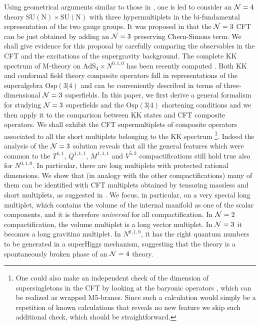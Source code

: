 \documentclass[a4paper,12pt]{article}
\def\n010{N^{0,1,0}}
\begin{document}
Using geometrical arguments similar to those in \cite{witkleb,3dcft},
one is led to consider an ${\cal N}=4$ theory $\mathrm{SU(N)}\times
\mathrm{SU(N)}$ with three hypermultiplets in the bi-fundamental
representation of the two gauge groups.
It was proposed in \cite{gukov} that the ${\cal N}=3$ CFT can be
just obtained by adding an ${\cal N}=3$ preserving Chern-Simons term.
We shall give evidence for this proposal by carefully comparing the
observables in the CFT and the excitations of the supergravity
background.
The complete KK spectrum of M-theory on AdS$_4\times N^{0,1,0}$
has been recently computed \cite{n010massspectrum,osp34}.
Both KK and conformal field theory composite operators fall in
representations of the superalgebra $\mathrm{Osp(3|4)}$ and can be
conveniently described in terms of three-dimensional ${\cal N}=3$
superfields.
In this paper, we first derive a general formalism for studying
${\cal N}=3$ superfields and the $\mathrm{Osp(3|4)}$ shortening
conditions and we then apply it to the comparison between KK states
and CFT composite operators.
We shall exhibit the CFT supermultiplets of composite operators
associated to all the short multiplets belonging to the KK
spectrum \footnote{One could also make an independent check of
the dimension of supersingletons in the CFT by looking at the
baryonic operators \cite{gubserkleb,3dcft}, which can be realized
as wrapped M5-branes. Since such a calculation would simply
be a repetition of known calculations that reveals no new feature
we skip such additional check, which should be straightforward.}.
Indeed the analysis of the ${\cal N}=3$ solution reveals that all
the general features which were common to the $T^{1,1}$, $Q^{1,1,1}$,
$M^{1,1,1}$ and $V^{5,2}$ compactifications \cite{gubser,sergiotorino,
3dcft,poliv52} still hold true also for $N^{0,1,0}$.
In particular, there are long multiplets with protected rational
dimensions.
We show that (in analogy with the other compactifications) many of
them can be identified with CFT multiplets obtained by tensoring
massless and short multiplets, as suggested in \cite{sergiotorino}.
We focus, in particular, on a very special long multiplet, which
contains the volume of the internal manifold as one of the scalar
components, and it is therefore {\it universal} for all compactification.
In ${\cal N}=2$ compactification, the volume multiplet is a long
vector multiplet.
In ${\cal N}=3$ it becomes a long gravitino multiplet.
In $\n010$, it has the right quantum numbers to be generated in a
superHiggs mechanism,  suggesting that the theory is a spontaneously
broken phase of an ${\cal N}=4 $ theory.
\end{document}
